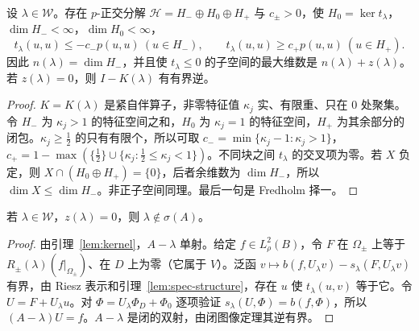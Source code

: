 \documentclass[11pt,a4paper,fontset=fandol]{ctexart}
\begin{document}
\begin{lemma}[谱结构]
\label{lem:spec-structure}
设 $\lambda\in\mathcal W$。存在 $p$-正交分解 $\mathcal H=H_-\oplus H_0\oplus H_+$ 与 $c_\pm>0$，使 $H_0=\ker t_\lambda$，$\dim H_-<\infty$，$\dim H_0<\infty$，
\[
t_\lambda(u,u)\le-c_-p(u,u)\ (u\in H_-),\qquad t_\lambda(u,u)\ge c_+p(u,u)\ (u\in H_+).
\]
因此 $n(\lambda)=\dim H_-$，并且使 $t_\lambda\le0$ 的子空间的最大维数是 $n(\lambda)+z(\lambda)$。若 $z(\lambda)=0$，则 $I-K(\lambda)$ 有有界逆。
\end{lemma}

\begin{proof}
$K=K(\lambda)$ 是紧自伴算子，非零特征值 $\kappa_j$ 实、有限重、只在 0 处聚集。令 $H_-$ 为 $\kappa_j>1$ 的特征空间之和，$H_0$ 为 $\kappa_j=1$ 的特征空间，$H_+$ 为其余部分的闭包。$\kappa_j\ge\frac12$ 的只有有限个，所以可取 $c_-=\min\{\kappa_j-1:\kappa_j>1\}$，$c_+=1-\max(\{\frac12\}\cup\{\kappa_j:\frac12\le\kappa_j<1\})$。不同块之间 $t_\lambda$ 的交叉项为零。若 $X$ 负定，则 $X\cap(H_0\oplus H_+)=\{0\}$，后者余维数为 $\dim H_-$，所以 $\dim X\le\dim H_-$。非正子空间同理。最后一句是 Fredholm 择一。
\end{proof}

\begin{lemma}[可逆点属于预解集]
\label{lem:resolvent}
若 $\lambda\in\mathcal W$，$z(\lambda)=0$，则 $\lambda\notin\sigma(A)$。
\end{lemma}

\begin{proof}
由引理~\ref{lem:kernel}，$A-\lambda$ 单射。给定 $f\in L^2_\rho(B)$，令 $F$ 在 $\Omega_\pm$ 上等于 $R_\pm(\lambda)(f|_{\Omega_\pm})$、在 $D$ 上为零（它属于 $V$）。泛函 $v\mapsto b(f,U_\lambda v)-s_\lambda(F,U_\lambda v)$ 有界，由 Riesz 表示和引理~\ref{lem:spec-structure}，存在 $u$ 使 $t_\lambda(u,v)$ 等于它。令 $U=F+U_\lambda u$。对 $\Phi=U_\lambda\Phi_D+\Phi_0$ 逐项验证 $s_\lambda(U,\Phi)=b(f,\Phi)$，所以 $(A-\lambda)U=f$。$A-\lambda$ 是闭的双射，由闭图像定理其逆有界。
\end{proof}
\end{document}
